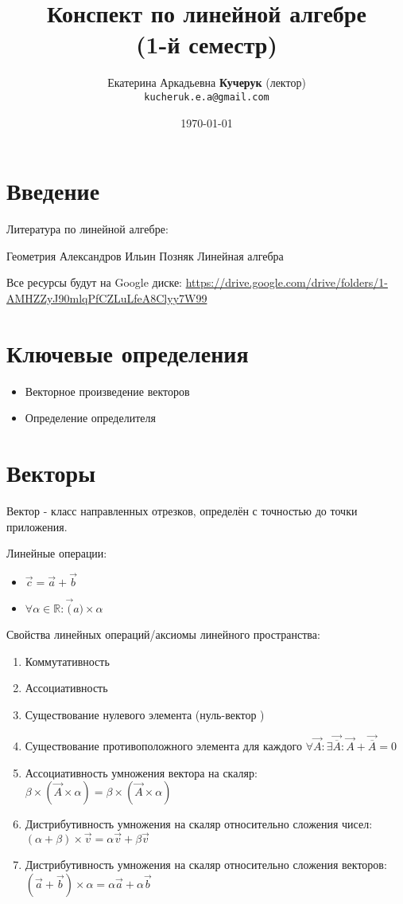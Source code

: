 \documentclass[12pt, a4paper]{article}
\title{Конспект по линейной алгебре \\ (1-й семестр)}
\author{
  \vova
  \and
  Екатерина Аркадьевна \textbf{Кучерук} (лектор)\\
  \texttt{kucheruk.e.a@gmail.com}
}
\date{\today}
\begin{document}
    \tittoc

    \section{Введение}

    Литература по линейной алгебре:

    Геометрия Александров
    Ильин Позняк  Линейная алгебра

    Все ресурсы будут на Google диске: \url{https://drive.google.com/drive/folders/1-AMHZZyJ90mlqPfCZLuLfeA8Clyy7W99}

    \section{Ключевые определения}
    \begin{itemize}
        \item Векторное произведение векторов
        \item Определение определителя
    \end{itemize}

    \section{Векторы}
    
    Вектор - класс направленных отрезков, 
    определён с точностью до точки приложения.

    Линейные операции:
    \begin{itemize}
        \item $\vec{c} = \vec{a} + \vec{b}$
        \item $\forall \alpha \in \mathbb{R}: \vec(a) \times \alpha$
    \end{itemize}

    Свойства линейных операций/аксиомы линейного пространства:
    \begin{enumerate}
        \item Коммутативность
        \item Ассоциативность
        \item Существование нулевого элемента (нуль-вектор  )
        \item Существование противоположного элемента для каждого 
                $\forall \vec{A}: \exists \vec{\overline{A}}: \vec{A} + \vec{\overline{A}} = 0$
        \item Ассоциативность умножения вектора на скаляр: $\beta \times (\vec{A} \times \alpha) = \beta \times (\vec{A} \times \alpha)$
        \item Дистрибутивность умножения на скаляр относительно сложения чисел: $(\alpha + \beta) \times \vec{v}  = \alpha \vec{v} + \beta \vec{v}$
        \item Дистрибутивность умножения на скаляр относительно сложения векторов: $(\vec{a} + \vec{b}) \times \alpha  = \alpha \vec{a} + \alpha \vec{b}$
    \end{enumerate}
    
\end{document}
